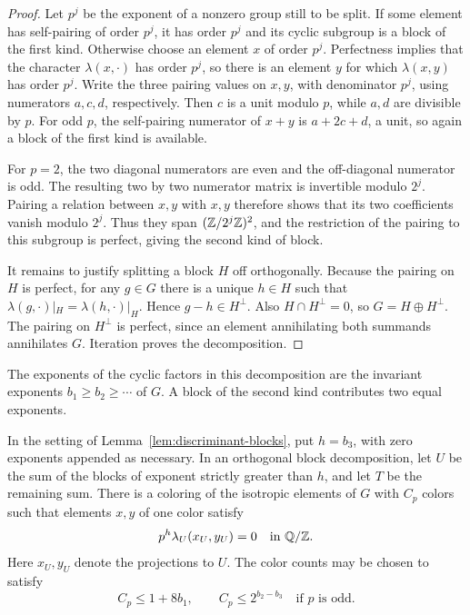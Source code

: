 \begin{proof}
Let \(p^j\) be the exponent of a nonzero group still to be split.
If some element has self-pairing of order \(p^j\), it has order
\(p^j\) and its cyclic subgroup is a block of the first kind.
Otherwise choose an element \(x\) of order \(p^j\). Perfectness
implies that the character \(\lambda(x,\cdot)\) has order \(p^j\),
so there is an element \(y\) for which \(\lambda(x,y)\) has order
\(p^j\). Write the three pairing values on \(x,y\), with denominator
\(p^j\), using numerators \(a,c,d\), respectively. Then \(c\) is
a unit modulo \(p\), while \(a,d\) are divisible by \(p\).
For odd \(p\), the self-pairing numerator of \(x+y\) is
\(a+2c+d\), a unit, so again a block of the first kind is available.

For \(p=2\), the two diagonal numerators are even and the
off-diagonal numerator is odd. The resulting two by two numerator
matrix is invertible modulo \(2^j\). Pairing a relation between
\(x,y\) with \(x,y\) therefore shows that its two coefficients
vanish modulo \(2^j\). Thus they span \((\mathbb Z/2^j\mathbb Z)^2\), and the
restriction of the pairing to this subgroup is perfect, giving the
second kind of block.

It remains to justify splitting a block \(H\) off orthogonally.
Because the pairing on \(H\) is perfect, for any \(g\in G\) there
is a unique \(h\in H\) such that
\(\lambda(g,\cdot)|_H=\lambda(h,\cdot)|_H\). Hence
\(g-h\in H^\perp\). Also \(H\cap H^\perp=0\), so
\(G=H\oplus H^\perp\). The pairing on \(H^\perp\) is perfect,
since an element annihilating both summands annihilates \(G\).
Iteration proves the decomposition.
\end{proof}

The exponents of the cyclic factors in this decomposition are the
invariant exponents \(b_1\ge b_2\ge\cdots\) of \(G\). A block of the
second kind contributes two equal exponents.

\begin{lemma}\label{lem:primary-coloring}
In the setting of Lemma~\ref{lem:discriminant-blocks}, put \(h=b_3\),
with zero exponents appended as necessary. In an orthogonal block
decomposition, let \(U\) be the sum of the blocks of exponent
strictly greater than \(h\), and let \(T\) be the remaining sum.
There is a coloring of the isotropic elements of \(G\) with \(C_p\)
colors such that elements \(x,y\) of one color satisfy
\begin{equation}\label{eq:primary-color-pairing}
 p^h\lambda_U(x_U,y_U)=0\quad\text{in }\mathbb Q/\mathbb Z.
\end{equation}
Here \(x_U,y_U\) denote the projections to \(U\). The color counts
may be chosen to satisfy
\[
 C_p\le 1+8b_1,\qquad
 C_p\le 2^{b_2-b_3}\quad\text{if \(p\) is odd}.
\]
\end{lemma}


